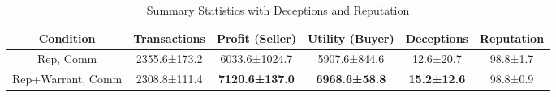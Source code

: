 \begin{table}[t]
    \centering
    \caption{Summary Statistics with Deceptions and Reputation}
    \label{tab:rq3_summary_stats}
    \begin{tabular}{cccccc}
    \toprule
    \textbf{Condition} & \textbf{Transactions} & \textbf{Profit (Seller)} & \textbf{Utility (Buyer)} & \textbf{Deceptions} & \textbf{Reputation} \\
    \midrule
    Rep, Comm & 2355.6±173.2 & 6033.6±1024.7 & 5907.6±844.6 & 12.6±20.7 & 98.8±1.7 \\
    Rep+Warrant, Comm & 2308.8±111.4 & \textbf{7120.6±137.0} & \textbf{6968.6±58.8} & \textbf{15.2±12.6} & 98.8±0.9 \\
    \bottomrule
    \end{tabular}
\end{table}
